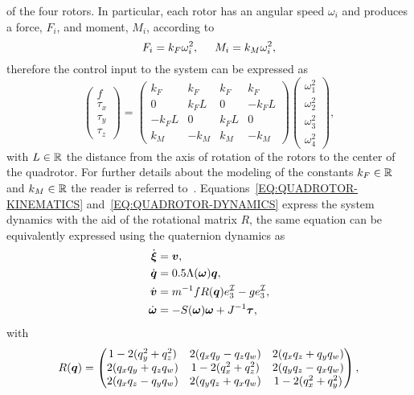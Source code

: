of the four rotors. In particular, each rotor has an angular speed $\omega_i$ and produces a force, $F_i$, and moment, $M_i$, according to
\begin{equation*}
    F_i = k_F \omega^2_i, \hspace{0.5cm} M_i = k_M \omega^2_i,
\end{equation*}
therefore the control input to the system can be expressed as
\begin{equation*}
    \begin{pmatrix}
        f \\ \tau_x \\ \tau_y \\ \tau_z
    \end{pmatrix} =
    \begin{pmatrix}
        k_F & k_F & k_F & k_F \\
        0 & k_FL & 0 & -k_FL \\
        -k_FL & 0 & k_FL & 0 \\
        k_M & -k_M & k_M & -k_M
    \end{pmatrix}
    \begin{pmatrix}
        \omega_1^2 \\ \omega_2^2 \\ \omega_3^2 \\ \omega_4^2
    \end{pmatrix},
\end{equation*}
with $L \in \mathbb{R}$ the distance from the axis of rotation of the rotors to the center of the quadrotor.
For further details about the modeling of the constants $k_F \in \mathbb{R}$ and $k_M \in \mathbb{R}$ the reader is referred to~\cite{kai2017nonlinear}.
Equations~\eqref{EQ:QUADROTOR-KINEMATICS} and~\eqref{EQ:QUADROTOR-DYNAMICS} express the system dynamics with the aid of the rotational
matrix $R$, the same equation can be equivalently expressed using the quaternion dynamics as
\begin{equation}%
    \label{EQ:QUATERNION-QUADROTOR-DYNAMICS}
    \begin{split}
        \dot{\bs{\xi}} & = \bs{v}, \\
        \dot{\bs{q}} & = 0.5 \Lambda(\bs{\omega})\bs{q}, \\
        \dot{\bs{v}} & = m^{-1}fR(\bs{q})e^{\II}_3 - ge^{\II}_3, \\
        \dot{\bs{\omega}} & = -S(\bs{\omega})\bs{\omega} + J^{-1}\bs{\tau},
    \end{split}
\end{equation}
with
\begin{equation*}
    R(\boldsymbol{q}) =
    \begin{pmatrix}
        1 - 2(q_y^2 + q_z^2) & 2(q_x q_y - q_z q_w) & 2(q_x q_z + q_y q_w) \\
        2(q_x q_y + q_z q_w) & 1 - 2(q_x^2 + q_z^2) & 2(q_y q_z - q_x q_w) \\
        2(q_x q_z - q_y q_w) & 2(q_y q_z + q_x q_w) & 1 - 2(q_x^2 + q_y^2)
    \end{pmatrix},
\end{equation*}

